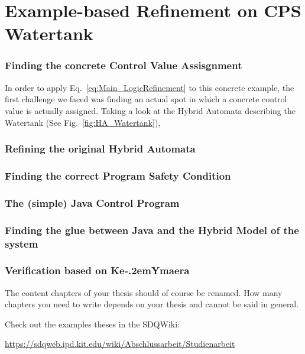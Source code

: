 
\chapter{Example-based Refinement on CPS Watertank}
\label{ch:FirstContent}

\subsection{Finding the concrete Control Value Assisgnment}
In order to apply Eq.~\ref{eq:Main_LogicRefinement} to this concrete example, the first challenge we faced was finding an actual spot in which a concrete control value is actually assigned. Taking a look at the Hybrid Automata describing the Watertank (See Fig.~\ref{fig:HA_Watertank}), 
\subsection{Refining the original Hybrid Automata}
\subsection{Finding the correct Program Safety Condition}
\subsection{The (simple) Java Control Program}
\subsection{Finding the glue between Java and the Hybrid Model of the system}
\subsection{Verification based on Ke\kern-.2emYmaera}
\iffalse
The content chapters of your thesis should of course be renamed. How many
chapters you need to write depends on your thesis and cannot be said in general.

Check out the examples theses in the SDQWiki:

\url{https://sdqweb.ipd.kit.edu/wiki/Abschlussarbeit/Studienarbeit}

